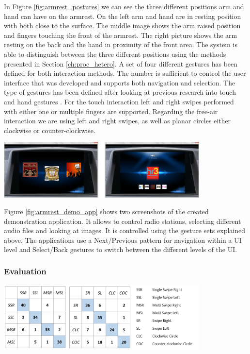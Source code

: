 In Figure \ref{fig:armrest_postures} we can see the three different positions arm and hand can have on the armrest. On the left arm and hand are in resting position with both close to the surface. The middle image shows the arm raised position and fingers touching the front of the armrest. The right picture shows the arm resting on the back and the hand in proximity of the front area. The system is able to distinguish between the three different positions using the methods presented in Section \ref{ch:proc_hetero}. A set of four different gestures has been defined for both interaction methods. The number is sufficient to control the user interface that was developed and supports both navigation and selection. The type of gestures has been defined after looking at previous research into touch and hand gestures \cite{bragdon2011experimental, wachs2011vision}. For the touch interaction left and right swipes performed with either one or multiple fingers are supported. Regarding the free-air interaction we are using left and right swipes, as well as planar circles either clockwise or counter-clockwise.

\begin{minipage}{\linewidth}
\centering
\includegraphics[width=0.8\textwidth]{images/armrest_demo_app}
\label{fig:armrest_demo_app}
\end{minipage}

Figure \ref{fig:armrest_demo_app} shows two screenshots of the created demonstration application. It allows to control radio stations, selecting different audio files and looking at images. It is controlled using the gesture sets explained above. The applications use a Next/Previous pattern for navigation within a UI level and Select/Back gestures to switch between the different levels of the UI.

\subsubsection{Evaluation}
\begin{minipage}{\linewidth}
\centering
\includegraphics[width=0.8\textwidth]{images/armrest_eval_confustion}
\label{fig:armrest_eval_confustion}
\end{minipage}

